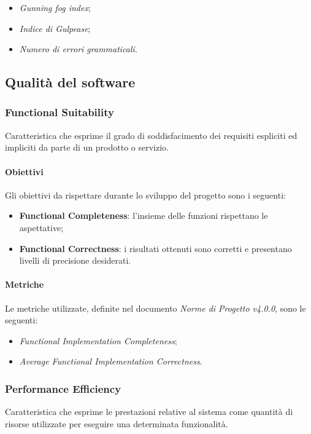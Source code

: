 \begin{itemize}
		\item{\emph{Gunning fog index};}
		\item{\emph{Indice di Gulpease};}
		\item{\emph{Numero di errori grammaticali}.}
\end{itemize}

\subsection{Qualità del software}
\subsubsection{Functional Suitability}
	Caratteristica che esprime il grado di soddisfacimento dei requisiti espliciti ed impliciti da parte di un prodotto o servizio. 
\paragraph{Obiettivi}\Spazio
Gli obiettivi da rispettare durante lo sviluppo del progetto sono i seguenti:
	\begin{itemize}
			\item{\textbf{Functional Completeness}: l'insieme delle funzioni rispettano le aspettative;
			}
			\item{\textbf{Functional Correctness}: i risultati ottenuti sono corretti e presentano livelli di precisione desiderati.
			}
	\end{itemize}

\paragraph{Metriche} \Spazio
Le metriche utilizzate, definite nel documento \emph{Norme di Progetto v4.0.0}, sono le seguenti:
	\begin{itemize}
		\item{\emph{Functional Implementation Completeness};}
		\item{\emph{Average Functional Implementation Correctness}.}
	\end{itemize}

\subsubsection{Performance Efficiency}
	Caratteristica che esprime le prestazioni relative al sistema come quantità di risorse utilizzate per eseguire una determinata funzionalità. 
